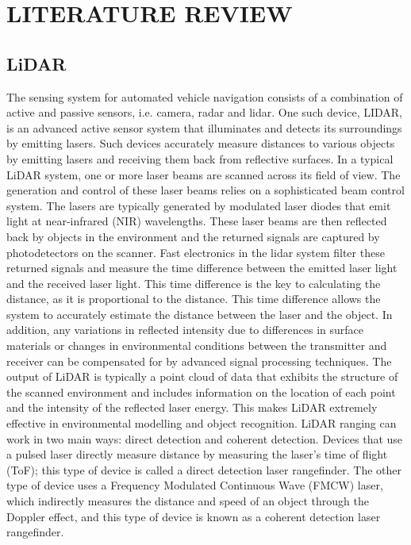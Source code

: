 \section{LITERATURE REVIEW}
\label{sec:literature_review}
\subsection{LiDAR}
The sensing system for automated vehicle navigation consists of a combination of active and passive sensors, i.e. camera, radar and lidar.
One such device, LIDAR, is an advanced active sensor system that illuminates and detects its surroundings by emitting lasers. Such devices accurately measure distances to various objects by emitting lasers and receiving them back from reflective surfaces. In a typical LiDAR system, one or more laser beams are scanned across its field of view. The generation and control of these laser beams relies on a sophisticated beam control system. The lasers are typically generated by modulated laser diodes that emit light at near-infrared (NIR) wavelengths. These laser beams are then reflected back by objects in the environment and the returned signals are captured by photodetectors on the scanner. Fast electronics in the lidar system filter these returned signals and measure the time difference between the emitted laser light and the received laser light. This time difference is the key to calculating the distance, as it is proportional to the distance. This time difference allows the system to accurately estimate the distance between the laser and the object. In addition, any variations in reflected intensity due to differences in surface materials or changes in environmental conditions between the transmitter and receiver can be compensated for by advanced signal processing techniques. The output of LiDAR is typically a point cloud of data that exhibits the structure of the scanned environment and includes information on the location of each point and the intensity of the reflected laser energy. This makes LiDAR extremely effective in environmental modelling and object recognition.
LiDAR ranging can work in two main ways: direct detection and coherent detection. Devices that use a pulsed laser directly measure distance by measuring the laser's time of flight (ToF); this type of device is called a direct detection laser rangefinder. The other type of device uses a Frequency Modulated Continuous Wave (FMCW) laser, which indirectly measures the distance and speed of an object through the Doppler effect, and this type of device is known as a coherent detection laser rangefinder.

